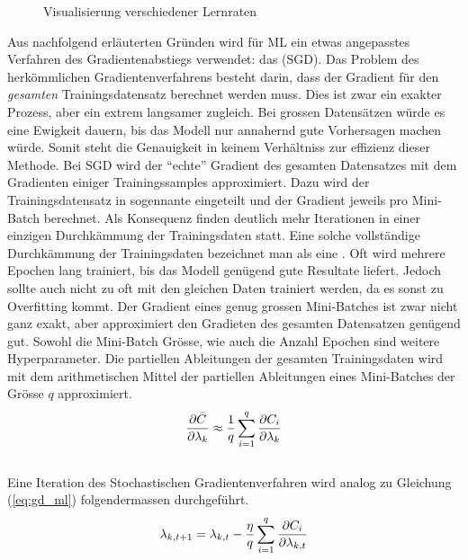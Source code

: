 \begin{figure}[h!]
  \centering
  \caption{Visualisierung verschiedener Lernraten}
\end{figure}

Aus nachfolgend erläuterten Gründen wird für ML ein etwas angepasstes
Verfahren des Gradientenabstiegs verwendet: das  (SGD).
Das Problem des herkömmlichen Gradientenverfahrens besteht darin, dass der
Gradient für den \textit{gesamten} Trainingsdatensatz berechnet werden muss.
Dies ist zwar ein exakter Prozess, aber ein extrem langsamer zugleich.
Bei grossen Datensätzen würde es eine Ewigkeit dauern, bis das Modell nur annahernd gute Vorhersagen machen würde.
Somit steht die Genauigkeit in keinem Verhältniss zur effizienz dieser Methode.
\para{}
Bei SGD wird der ``echte'' Gradient des gesamten Datensatzes mit dem Gradienten einiger Trainingssamples approximiert.
Dazu wird der Trainingsdatensatz in sogennante  eingeteilt und der Gradient jeweils pro Mini-Batch berechnet.
Als Konsequenz finden deutlich mehr Iterationen in einer einzigen
Durchkämmung der Trainingsdaten statt. Eine solche vollständige Durchkämmung der Trainingsdaten
bezeichnet man als eine .
Oft wird mehrere Epochen lang trainiert, bis das Modell genügend gute Resultate
liefert. Jedoch sollte auch nicht zu oft mit den gleichen Daten trainiert
werden, da es sonst zu Overfitting kommt.
Der Gradient eines genug grossen Mini-Batches ist zwar nicht ganz exakt, aber approximiert den Gradieten des gesamten Datensatzen genügend gut.
Sowohl die Mini-Batch Grösse, wie auch die Anzahl Epochen sind weitere Hyperparameter.
\para{}
Die partiellen Ableitungen der gesamten Trainingsdaten wird mit dem
arithmetischen Mittel der partiellen Ableitungen eines Mini-Batches der Grösse $q$ approximiert.
\\
\begin{equation}\label{eq:minibatch_deriv}
  \frac{\partial \bar{C}}{\partial \lambda_k} \approx \frac{1}{q}\sum_{i=1}^{q} \frac{\partial C_i}{\partial \lambda_k}
\end{equation}
\\
Eine Iteration des Stochastischen Gradientenverfahren wird analog zu Gleichung (\ref{eq:gd_ml}) folgendermassen durchgeführt.
\\
\begin{equation}\label{eq:sgd}
  \lambda_{k,t+1} = \lambda_{k,t} - \frac{\eta}{q} \sum_{i=1}^{q} \frac{\partial C_i}{\partial \lambda_{k,t}}
\end{equation}

